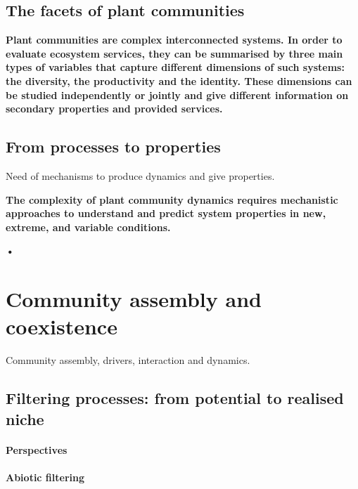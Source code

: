 \subsection{The facets of plant communities}

\textbf{Plant communities are complex interconnected systems. In order to evaluate ecosystem services, they can be summarised by three main types of variables that capture different dimensions of such systems: the diversity, the productivity and the identity. These dimensions can be studied independently or jointly and give different information on secondary properties and provided services.}

\subsection{From processes to properties}
Need of mechanisms to produce dynamics and give properties.

\textbf{The complexity of plant community dynamics requires mechanistic approaches to understand and predict system properties in new, extreme, and variable conditions. }

\textbf{•}

\section{Community assembly and coexistence}

Community assembly, drivers, interaction and dynamics.


\subsection{Filtering processes: from potential to realised niche}

\paragraph{Perspectives}

\paragraph{Abiotic filtering}


